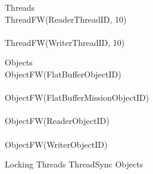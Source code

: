 %
\begin{circus}
\circprocess Threads \circdef  \\
\circblockopen
ThreadFW(ReaderThreadID, 10) \\
\interleave \\
ThreadFW(WriterThreadID, 10) \\

\circblockclose
\end{circus}
%
%
\begin{circus}
\circprocess Objects \circdef \\
\circblockopen
ObjectFW(FlatBufferObjectID) \\
\interleave \\
ObjectFW(FlatBufferMissionObjectID) \\
\interleave \\
ObjectFW(ReaderObjectID) \\
\interleave \\
ObjectFW(WriterObjectID) \\

\circblockclose
\end{circus}
%
%
\begin{circus}
\circprocess Locking \circdef Threads \lpar ThreadSync \rpar Objects
\end{circus}
